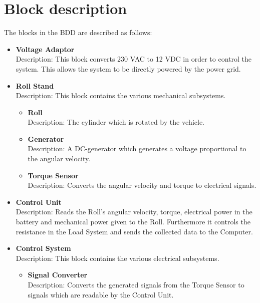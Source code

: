 \section{Block description} 

The blocks in the BDD are described as follows:
\begin{itemize}
	\item \textbf{Voltage Adaptor}\\
	Description: This block converts 230 VAC to 12 VDC in order to control the system. This allows the system to be directly powered by the power grid. 
	\item \textbf{Roll Stand}\\
	Description: This block contains the various mechanical subsystems.
	\begin{itemize}
		\item \textbf{Roll}\\
		Description: The cylinder which is rotated by the vehicle.
		\item \textbf{Generator}\\
		Description: A DC-generator which generates a voltage proportional to the angular velocity.
		\item \textbf{Torque Sensor}\\
		Description: Converts the angular velocity and torque to electrical signals.
	\end{itemize}
	\item \textbf{Control Unit}\\
	Description:  Reads the Roll's angular velocity, torque, electrical power in the battery and mechanical power given to the Roll. Furthermore it controls the resistance in the Load System and sends the collected data to the Computer.
	\item \textbf{Control System} \\
	Description: This block contains the various electrical subsystems.
	\begin{itemize}
		\item \textbf{Signal Converter}\\
		Description: Converts the generated signals from the Torque Sensor to signals which are readable by the Control Unit.

\end{itemize}
\end{itemize}
